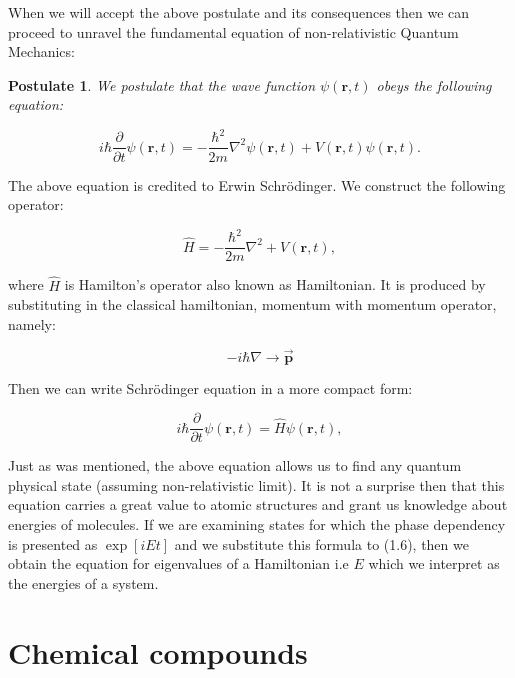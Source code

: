 \documentclass[a4paper,oneside,openright,11pt]{book}
\newtheorem{theorem}{Postulate}
\begin{document}
When we will accept the above postulate and its consequences then we can proceed to unravel the fundamental equation of non-relativistic Quantum Mechanics: 


\begin{theorem}
We postulate that the wave function $\psi(\textbf{r}, t)$ obeys the following equation:

\begin{equation}
    i \hbar \frac{\partial}{\partial t} \psi(\textbf{r}, t) = - \frac{\hbar^2}{2m} \nabla^{2} \psi(\textbf{r}, t) + V(\textbf{r}, t)\psi(\textbf{r}, t).
\end{equation}

\end{theorem}

The above equation is credited to Erwin Schrödinger. We construct the following operator:

\begin{equation}
    \hat{H} = - \frac{\hbar^2}{2m}\nabla^{2} + V(\textbf{r}, t),
\end{equation}

where $\hat{H}$ is Hamilton's operator also known as Hamiltonian. It is produced by substituting in the classical hamiltonian, momentum with momentum operator, namely:

\begin{equation*}
    -i \hbar \nabla \rightarrow \overrightarrow{\textbf{p}}
\end{equation*}



Then we can write Schrödinger equation in a more compact form:\cite{kryszewski}

\begin{equation}
    i \hbar \frac{\partial}{\partial t} \psi(\textbf{r}, t) = \hat{H} \psi(\textbf{r}, t),
\end{equation}


Just as was mentioned, the above equation allows us to find any quantum physical state (assuming non-relativistic limit). It is not a surprise then that this equation carries a great value to atomic structures and grant us knowledge about energies of molecules. If we are examining states for which the phase dependency is presented as $\exp{[iEt]}$ and we substitute this formula to (1.6), then we obtain the equation for eigenvalues of a Hamiltonian i.e $E$ which we interpret as the energies of a system.

\section{Chemical compounds}
\end{document}
